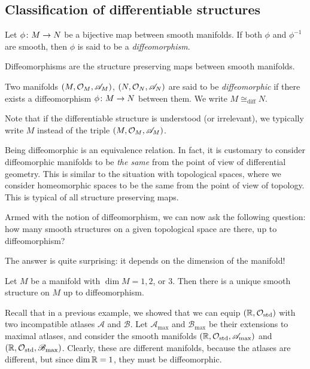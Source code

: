 \subsection{Classification of differentiable structures}

\bd
Let $\phi\colon M \to N$ be a bijective map between smooth manifolds. If both $\phi$ and $\phi^{-1}$ are smooth, then $\phi$ is said to be a \emph{diffeomorphism}.
\ed

Diffeomorphisms are the structure preserving maps between smooth manifolds. 

\bd
Two manifolds $(M,\mathcal{O}_M,\mathscr{A}_M)$, $(N,\mathcal{O}_N,\mathscr{A}_N)$ are said to be \emph{diffeomorphic} if there exists a diffeomorphism $\phi\colon M\to N$ between them. We write $M \cong_\text{diff}N$.
\ed

Note that if the differentiable structure is understood (or irrelevant), we typically write $M$ instead of the triple $(M,\mathcal{O}_M,\mathscr{A}_M)$.

\br
Being diffeomorphic is an equivalence relation. In fact, it is customary to consider diffeomorphic manifolds to be \emph{the same} from the point of view of differential geometry. This is similar to the situation with topological spaces, where we consider homeomorphic spaces to be the same from the point of view of topology. This is typical of all structure preserving maps.
\er

Armed with the notion of diffeomorphism, we can now ask the following question: how many smooth structures on a given topological space are there, up to diffeomorphism?

The answer is quite surprising: it depends on the dimension of the manifold!

\begin{theorem}
Let $M$ be a manifold with $\dim M = 1, 2$, or $3$. Then there is a unique smooth structure on $M$ up to diffeomorphism.
\end{theorem}

Recall that in a previous example, we showed that we can equip $(\mathbb{R},\mathcal{O}_\mathrm{std})$ with two incompatible atlases $\mathscr{A}$ and $\mathscr{B}$. Let $\mathscr{A}_\mathrm{max}$ and $\mathscr{B}_\mathrm{max}$ be their extensions to maximal atlases, and consider the smooth manifolds $(\mathbb{R},\mathcal{O}_\mathrm{std},\mathscr{A}_\mathrm{max})$ and  $(\mathbb{R},\mathcal{O}_\mathrm{std},\mathscr{B}_\mathrm{max})$. Clearly, these are different manifolds, because the atlases are different, but since $\dim \mathbb{R}=1$, they must be diffeomorphic.

